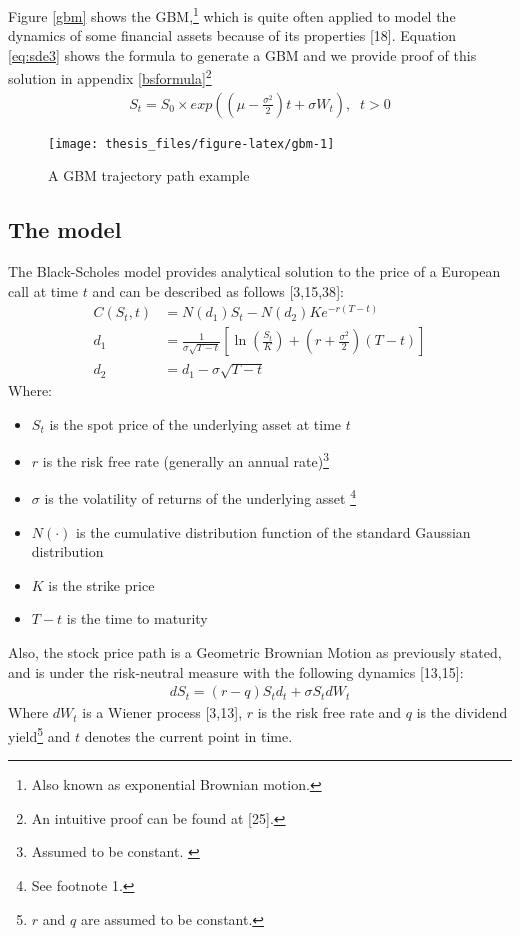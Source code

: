 \documentclass[12pt,twoside]{reedthesis}
\providecommand{\tightlist}{%
  \setlength{\itemsep}{0pt}\setlength{\parskip}{0pt}}
\theoremstyle{definition}
\theoremstyle{definition}
\theoremstyle{remark}
\begin{document}
  Figure \ref{gbm} shows the GBM,\footnote{Also known as exponential
    Brownian motion.} which is quite often applied to model the dynamics
  of some financial assets because of its properties {[}18{]}. Equation
  \eqref{eq:sde3} shows the formula to generate a GBM and we provide proof
  of this solution in appendix \ref{bsformula}\footnote{An intuitive proof
    can be found at {[}25{]}.}
  \begin{align} \label{eq:sde3}
  S_t = S_0 \times exp{\left( \left( \mu - \frac{\sigma^2}{2} \right) t + \sigma W_t \right)}, \;\; t > 0
  \end{align}
  \begin{figure}
  
  {\centering \texttt{[image: thesis\_files/figure-latex/gbm-1]} 
  
  }
  
  \caption{A GBM trajectory path example \label{gbm}}\label{fig:gbm}
  \end{figure}
  \subsection{The model}\label{the-model}
  
  The Black-Scholes model provides analytical solution to the price of a
  European call at time \(t\) and can be described as follows
  {[}3,15,38{]}:
  \begin{align}
  C(S_{t},t)&=N(d_{1})S_{t}-N(d_{2})Ke^{-r(T-t)}\\[10pt]
  d_{1}&={\frac {1}{\sigma {\sqrt {T-t}}}}\left[\ln \left({\frac {S_{t}}{K}}\right)+\left(r+{\frac {\sigma ^{2}}{2}}\right)(T-t)\right]\\[10pt]
  d_{2}&=d_{1}-\sigma {\sqrt {T-t}}
  \end{align}
  \noindent
  Where:
  \begin{itemize}
  \tightlist
  \item
    \(S_{t}\) is the spot price of the underlying asset at time \(t\)
  \item
    \(r\) is the risk free rate (generally an annual
    rate)\footnote{Assumed to be constant. \label{teste}}
  \item
    \(\sigma\) is the volatility of returns of the underlying asset
    \footnote{See footnote 1.}
  \item
    \(N(\cdot )\) is the cumulative distribution function of the standard
    Gaussian distribution
  \item
    \(K\) is the strike price
  \item
    \(T-t\) is the time to maturity
  \end{itemize}
  \noindent
  Also, the stock price path is a Geometric Brownian Motion as previously
  stated, and is under the risk-neutral measure with the following
  dynamics {[}13,15{]}:
  \begin{align}
  dS_{t} = (r-q)S_td_t+\sigma S_t dW_t
  \end{align}
  \noindent
  Where \(dW_t\) is a Wiener process {[}3,13{]}, \(r\) is the risk free
  rate and \(q\) is the dividend
  yield\footnote{$r$ and $q$ are assumed to be constant.} and \(t\)
  denotes the current point in time.
  
\end{document}
